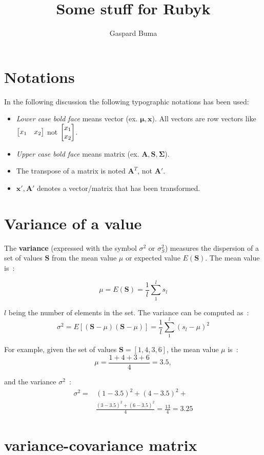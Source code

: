 \documentclass[11pt,twocolumn]{amsart} %
\title{Some stuff for Rubyk}
\author{Gaspard Buma}
\newcommand{\ve}[1]{\boldsymbol{#1}}
\newcommand{\ma}[1]{\boldsymbol{#1}}
\newenvironment{m}{\begin{bmatrix}}{\end{bmatrix}}
\begin{document}
\twocolumn[
\maketitle
]
\section{Notations}
In the following discussion the following typographic notations has been used:
\begin{itemize}
  \item \emph{Lower case bold face} means vector (ex. $\ve\mu, \ve{x}$). All vectors are row vectors like $\begin{m} x_1 & x_2 \end{m}$ not $\begin{m} x_1 \\ x_2 \end{m}$.
  \item \emph{Upper case bold face} means matrix (ex. $\ma{A}, \ma{S}, \ma{\Sigma}$).
  \item The transpose of a matrix is noted $\ma{A}^T$, not $\ma{A}'$.
  \item $\ve{x}', \ma{A}'$ denotes a vector/matrix that has been transformed.
\end{itemize}
\section{Variance of a value}

The \textbf{variance} (expressed with the symbol $\sigma^2$ or $\sigma_S^2$) measures the dispersion of a set of values $\ma{S}$ from the mean value $\mu$ or expected value $E(\ma{S})$. The mean value is~:

\[
  \mu = E(\ma{S}) = \frac{1}{l} \sum_1^{l} s_l
\]

$l$ being the number of elements in the set. The variance can be computed as~:
\[
  \sigma^2 = E[(\ma{S} - \mu)(\ma{S} - \mu)] = \frac{1}{l} \sum_1^{l} (s_l - \mu)^2
\]

For example, given the set of values $\ma{S} = [1,4,3,6]$, the mean value $\mu$ is~:
\[
  \mu = \frac{1+4+3+6}{4} = 3.5,
\]

and the variance $\sigma^2$~:
\begin{align*}
  \sigma^2 = & (1-3.5)^2 + (4-3.5)^2 +\\
             & \frac{(3-3.5)^2 + (6-3.5)^2}{4} = \frac{13}{4} = 3.25
\end{align*}

\section{variance-covariance matrix}
\end{document}
